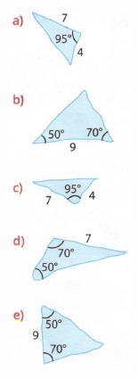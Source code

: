 \documentclass[a4paper,14pt]{article}
\begin{document}
\begin{multicols}{2}
\begin{enumerate}
			\includegraphics[width=1\linewidth]{6FMA123_imagens/imagem1}

\end{enumerate}
\end{multicols}
\end{document}
